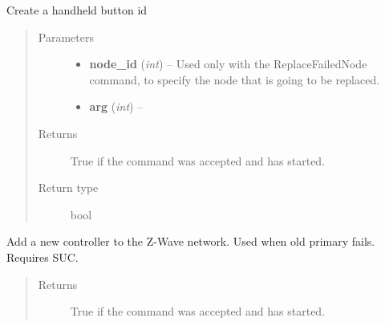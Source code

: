 \documentclass[letterpaper,10pt,english]{sphinxmanual}
\begin{document}
\begin{fulllineitems}
\begin{fulllineitems}
\begin{quote}
\begin{description}
\end{description}\end{quote}

\end{fulllineitems}


\begin{fulllineitems}
\label{controller:openzwave.controller.ZWaveController.begin_command_create_button}
Create a handheld button id
\begin{quote}\begin{description}
\item[{Parameters}] \leavevmode\begin{itemize}
\item {} 
\textbf{node\_id} (\emph{int}) -- Used only with the ReplaceFailedNode command, to specify the node that is going to be replaced.

\item {} 
\textbf{arg} (\emph{int}) -- 

\end{itemize}

\item[{Returns}] \leavevmode
True if the command was accepted and has started.

\item[{Return type}] \leavevmode
bool

\end{description}\end{quote}

\end{fulllineitems}


\begin{fulllineitems}
\label{controller:openzwave.controller.ZWaveController.begin_command_create_new_primary}
Add a new controller to the Z-Wave network. Used when old primary fails. Requires SUC.
\begin{quote}\begin{description}
\item[{Returns}] \leavevmode
True if the command was accepted and has started.


\end{description}
\end{quote}
\end{fulllineitems}
\end{fulllineitems}
\end{document}
